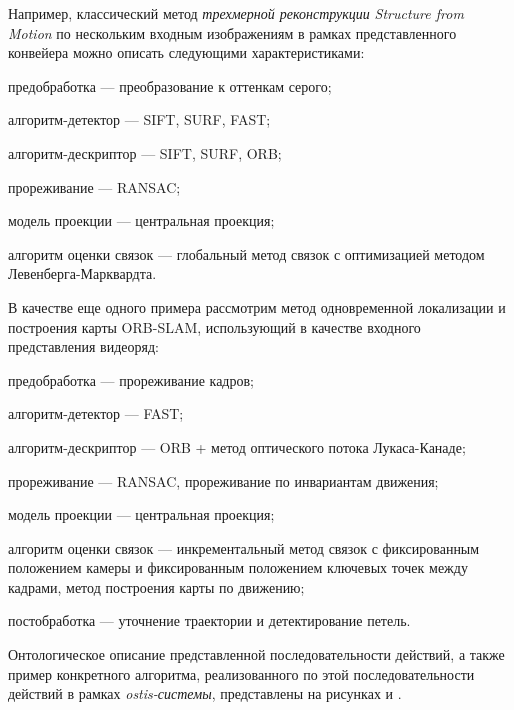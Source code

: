 Например, классический метод \textit{трехмерной реконструкции} \textit{Structure from Motion} по нескольким входным изображениям в рамках представленного конвейера можно описать следующими характеристиками:
\begin{textitemize}
    \item предобработка --- преобразование к оттенкам серого;
    \item алгоритм-детектор --- SIFT, SURF, FAST;
    \item алгоритм-дескриптор --- SIFT, SURF, ORB;
    \item прореживание --- RANSAC;
    \item модель проекции --- центральная проекция;
    \item алгоритм оценки связок --- глобальный метод связок с оптимизацией методом Левенберга-Марквардта.
\end{textitemize}
В качестве еще одного примера рассмотрим метод одновременной локализации и построения карты ORB-SLAM, использующий в качестве входного представления видеоряд:
\begin{textitemize}
    \item предобработка --- прореживание кадров;
    \item алгоритм-детектор --- FAST;
    \item алгоритм-дескриптор --- ORB + метод оптического потока Лукаса-Канаде;
    \item прореживание --- RANSAC, прореживание по инвариантам движения;
    \item модель проекции --- центральная проекция;
    \item алгоритм оценки связок --- инкрементальный метод связок с фиксированным положением камеры и фиксированным положением ключевых точек между кадрами, метод построения карты по движению;
    \item постобработка --- уточнение траектории и детектирование петель.
\end{textitemize}

Онтологическое описание представленной последовательности действий, а также пример конкретного алгоритма, реализованного по этой последовательности действий в рамках \textit{ostis-системы}, представлены на рисунках \textit{} и \textit{}.

